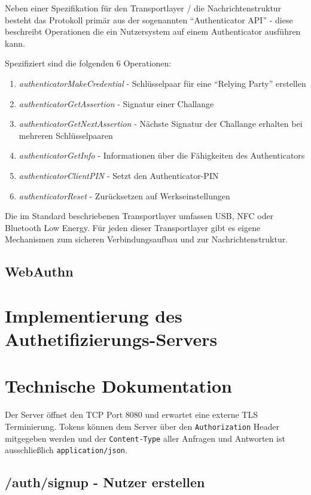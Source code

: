 \documentclass[journal]{IEEEtran}
\begin{document}
Neben einer Spezifikation für den Transportlayer / die Nachrichtenstruktur
besteht das Protokoll primär aus der sogenannten ``Authenticator API'' - diese
beschreibt Operationen die ein Nutzersystem auf einem Authenticator ausführen kann.

Spezifiziert sind die folgenden 6 Operationen:

\begin{enumerate}
	\item \textit{authenticatorMakeCredential} - Schlüsselpaar für eine
		``Relying Party'' erstellen
	\item \textit{authenticatorGetAssertion} - Signatur einer Challange
	\item \textit{authenticatorGetNextAssertion} - Nächste Signatur der
		Challange erhalten bei mehreren Schlüsselpaaren
	\item \textit{authenticatorGetInfo} - Informationen über die Fähigkeiten
		des Authenticators
	\item \textit{authenticatorClientPIN} - Setzt den Authenticator-PIN
	\item \textit{authenticatorReset} - Zurücksetzen auf Werkseinstellungen
\end{enumerate}

Die im Standard beschriebenen Transportlayer umfassen USB, NFC oder Bluetooth
Low Energy. Für jeden dieser Transportlayer gibt es eigene Mechanismen zum
sicheren Verbindungsaufbau und zur Nachrichtenstruktur.

\subsection{WebAuthn}


\section{Implementierung des Authetifizierungs-Servers}

\section{Technische Dokumentation}

Der Server öffnet den TCP Port 8080 und erwartet eine externe TLS
Terminierung. Tokens können dem Server über den \texttt{Authorization} Header
mitgegeben werden und der \texttt{Content-Type} aller Anfragen und Antworten
ist ausschließlich \texttt{application/json}.

\subsection{/auth/signup - Nutzer erstellen}
\end{document}

